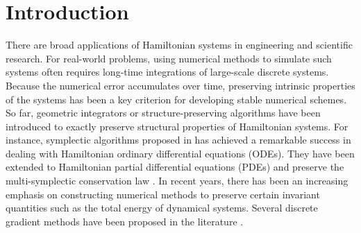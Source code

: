 \documentclass[11pt]{article}
\begin{document}
\section{Introduction}
\noindent \indent There are broad applications of Hamiltonian systems in engineering and scientific research.  For real-world problems, using numerical methods to simulate such systems often requires long-time integrations of large-scale discrete systems. Because the numerical error accumulates over time, preserving intrinsic properties of the systems has been a key criterion for developing stable numerical schemes.
So far, geometric integrators or structure-preserving algorithms have been introduced to exactly preserve structural properties of Hamiltonian systems. For instance, symplectic algorithms proposed in \cite{Hairer02,Feng03} has achieved a remarkable success in dealing with Hamiltonian ordinary differential equations (ODEs). They have been extended to Hamiltonian partial differential equations (PDEs) and preserve the multi-symplectic conservation law \cite{Bridges06,Wang2013}.
In recent years, there has been an increasing emphasis on constructing numerical methods to
preserve certain invariant quantities such as the total energy of dynamical systems.
Several discrete gradient methods have been proposed in the literature 
\cite{Gonzalez96,McLachlan99,Quispel08,Celledoni2012,Gong2014}. 


\end{document}
